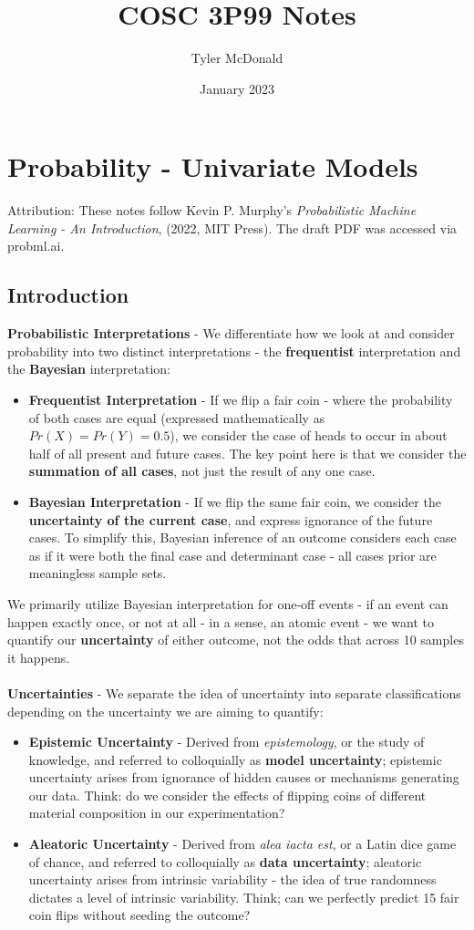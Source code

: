 \documentclass{article}
\title{COSC 3P99 Notes}
\author{Tyler McDonald}
\date{January 2023}
\begin{document}
\maketitle
\section{Probability - Univariate Models}

Attribution: These notes follow Kevin P. Murphy's \textit{Probabilistic Machine Learning - An Introduction}, (2022, MIT Press). The draft PDF was accessed via probml.ai.

\subsection{Introduction}
\textbf{Probabilistic Interpretations} - We differentiate how we look at and consider probability into two distinct interpretations - the \textbf{frequentist} interpretation and the \textbf{Bayesian} interpretation:
\begin{itemize}
\item \textbf{Frequentist Interpretation} - If we flip a fair coin - where the probability of both cases are equal (expressed mathematically as $Pr(X) = Pr(Y) = 0.5$), we consider the case of heads to occur in about half of all present and future cases. The key point here is that we consider the \textbf{summation of all cases}, not just the result of any one case.
\item \textbf{Bayesian Interpretation} - If we flip the same fair coin, we consider the \textbf{uncertainty of the current case}, and express ignorance of the future cases. To simplify this, Bayesian inference of an outcome considers each case as if it were both the final case and determinant case - all cases prior are meaningless sample sets.\\
\end{itemize}
We primarily utilize Bayesian interpretation for one-off events - if an event can happen exactly once, or not at all - in a sense, an atomic event - we want to quantify our \textbf{uncertainty} of either outcome, not the odds that across 10 samples it happens.\\
\\
\textbf{Uncertainties} - We separate the idea of uncertainty into separate classifications depending on the uncertainty we are aiming to quantify:
\begin{itemize}
\item \textbf{Epistemic Uncertainty} - Derived from \textit{epistemology}, or the study of knowledge, and referred to colloquially as \textbf{model uncertainty}; epistemic uncertainty arises from ignorance of hidden causes or mechanisms generating our data. Think: do we consider the effects of flipping coins of different material composition in our experimentation?
\item \textbf{Aleatoric Uncertainty} - Derived from \textit{alea iacta est}, or a Latin dice game of chance, and referred to colloquially as \textbf{data uncertainty}; aleatoric uncertainty arises from intrinsic variability - the idea of true randomness dictates a level of intrinsic variability. Think; can we perfectly predict 15 fair coin flips without seeding the outcome?
\end{itemize}
\end{document}
